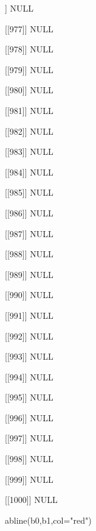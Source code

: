 \begin{Schunk}
\begin{Soutput}
[[976]]
NULL

[[977]]
NULL

[[978]]
NULL

[[979]]
NULL

[[980]]
NULL

[[981]]
NULL

[[982]]
NULL

[[983]]
NULL

[[984]]
NULL

[[985]]
NULL

[[986]]
NULL

[[987]]
NULL

[[988]]
NULL

[[989]]
NULL

[[990]]
NULL

[[991]]
NULL

[[992]]
NULL

[[993]]
NULL

[[994]]
NULL

[[995]]
NULL

[[996]]
NULL

[[997]]
NULL

[[998]]
NULL

[[999]]
NULL

[[1000]]
NULL
\end{Soutput}
\begin{Sinput}
 abline(b0,b1,col="red")
\end{Sinput}
\end{Schunk}
